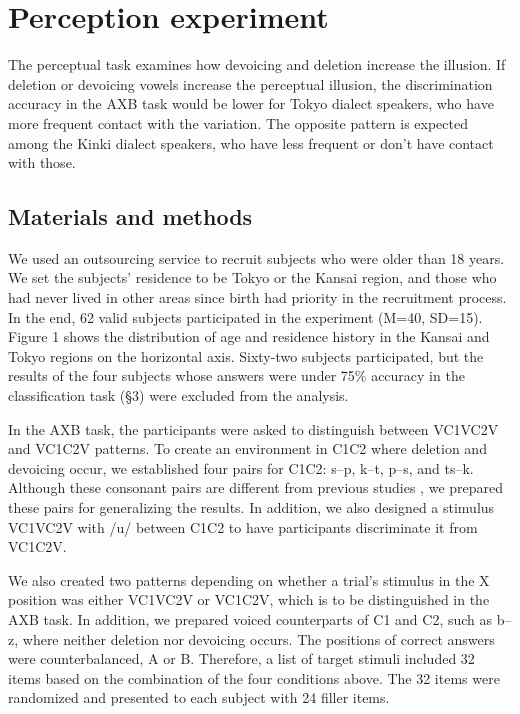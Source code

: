 \documentclass[a4paper,11pt,twocolumn]{article}
\begin{document}
\section{Perception experiment}

The perceptual task examines how devoicing and deletion increase the illusion. If deletion or devoicing vowels increase the perceptual illusion, the discrimination accuracy in the AXB task would be lower for Tokyo dialect speakers, who have more frequent contact with the variation. The opposite pattern is expected among the Kinki dialect speakers, who have less frequent or don't have contact with those.

\subsection{Materials and methods}

We used an outsourcing service to recruit subjects who were older than 18 years. We set the subjects' residence to be Tokyo or the Kansai region, and those who had never lived in other areas since birth had priority in the recruitment process. In the end, 62 valid subjects participated in the experiment (M=40, SD=15). Figure 1 shows the distribution of age and residence history in the Kansai and Tokyo regions on the horizontal axis. Sixty-two subjects participated, but the results of the four subjects whose answers were under 75\% accuracy in the classification task (§3) were excluded from the analysis.

In the AXB task, the participants were asked to distinguish between VC1VC2V and VC1C2V patterns. To create an environment in C1C2 where deletion and devoicing occur, we established four pairs for C1C2: s--p, k--t, p--s, and ts--k. Although these consonant pairs are different from previous studies \cite{kilpatrick2018japanese}, we prepared these pairs for generalizing the results. In addition, we also designed a stimulus VC1VC2V with /u/ between C1C2 to have participants discriminate it from VC1C2V.

We also created two patterns depending on whether a trial's stimulus in the X position was either VC1VC2V or VC1C2V, which is to be distinguished in the AXB task. In addition, we prepared voiced counterparts of C1 and C2, such as b--z, where neither deletion nor devoicing occurs. The positions of correct answers were counterbalanced, A or B. Therefore, a list of target stimuli included 32 items based on the combination of the four conditions above. The 32 items were randomized and presented to each subject with 24 filler items.
\end{document}
